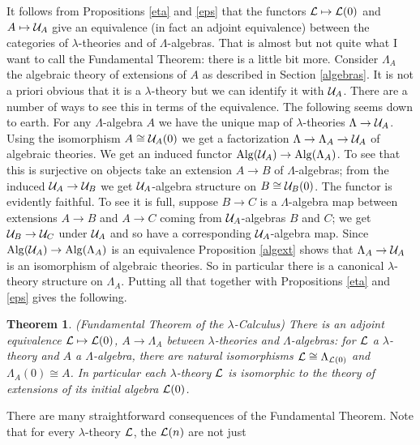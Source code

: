 \documentclass[12pt, amstex, amssymb]{article}
\newtheorem{theorem}{Theorem}[section]
\newcommand{\mcat}{\cal}
\begin{document}
It follows from Propositions \ref{eta} and \ref{eps} that the functors 
${\mcat L} \mapsto {\mcat L}(0)$ and
$A \mapsto {\mcat U}_A$ give an equivalence (in fact an adjoint
equivalence)
between the categories of $\lambda$-theories and of $\Lambda$-algebras.
That is almost but not quite what I want to 
call the Fundamental Theorem: there is a little bit more.
Consider $\Lambda_A$ the algebraic theory of extensions of $A$
as described in Section \ref{algebras}.
It is not a priori obvious that it is a $\lambda$-theory
but we can identify it with ${\mcat U}_A$. There are a number of ways to
see this in terms of the equivalence. The following seems
down to earth.
For any $\Lambda$-algebra $A$ we have
the unique map of $\lambda$-theories $\Lambda \to {\mcat U}_A$.
Using the isomorphism $A \cong {\mcat U}_A(0)$ we get a factorization
$\Lambda \to {\Lambda}_A \to {\mcat U}_A$ of algebraic theories. We get an
induced functor ${\rm Alg}({\mcat U}_A) \to{\rm Alg}({\Lambda}_A)$.
To see that this is surjective on objects take an extension
$A \to B$ of $\Lambda$-algebras; from the induced 
${\mcat U}_A \to {\mcat U}_B$ we get ${\mcat U}_A$-algebra
structure on $B \cong {\mcat U}_B(0)$. The functor is evidently faithful.
To see it is full, suppose $B \to C$ is a $\Lambda$-algebra
map between extensions $A \to B$ and $A \to C$ coming from
${\mcat U}_A$-algebras $B$ and $C$; we get ${\mcat U}_B \to {\mcat U}_C$
under ${\mcat U}_A$ and so have a corresponding ${\mcat U}_A$-algebra
map. Since ${\rm Alg}({\mcat U}_A) \to{\rm Alg}({\Lambda}_A)$ 
is an equivalence Proposition \ref{algext} shows that 
${\Lambda}_A \to {\mcat U}_A$ is an isomorphism of algebraic theories.
So in particular there is a canonical $\lambda$-theory
structure on ${\Lambda}_A$.
Putting all that together with Propositions \ref{eta} and \ref{eps} gives
the following.
\begin{theorem}\label{fundthm} 
{\rm (Fundamental Theorem of the $\lambda$-Calculus)}
There is an adjoint equivalence ${\mcat L} \mapsto {\mcat L}(0)$,
$A \to \Lambda_A$ between $\lambda$-theories and
$\Lambda$-algebras: for $\mcat L$ a $\lambda$-theory and 
$A$ a $\Lambda$-algebra,
there are natural isomorphisms ${\mcat L} \cong \Lambda_{{\mcat L}(0)}$ and
$\Lambda_A(0) \cong A$. In particular
each $\lambda$-theory $\mcat L$ is isomorphic 
to the theory of extensions of its initial algebra ${\mcat L}(0)$. 
\end{theorem}
There are many straightforward consequences of the Fundamental Theorem.
Note that for every $\lambda$-theory
$\mcat L$, the ${\mcat L}(n)$ are not just
\end{document}

